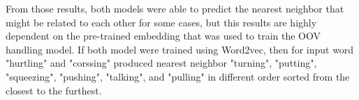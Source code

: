         From those results, both models were able to predict the
        nearest neighbor that might be related to each other for some
        cases, but this results are highly dependent on the pre-trained
        embedding that was used to train the OOV handling model. If both model
        were trained using Word2vec, then for input word "hurtling"
        and "corssing" produced nearest neighbor "turning", "putting",
        "squeezing", "pushing", "talking", and "pulling" in different
        order sorted from the closest to the furthest.
        


